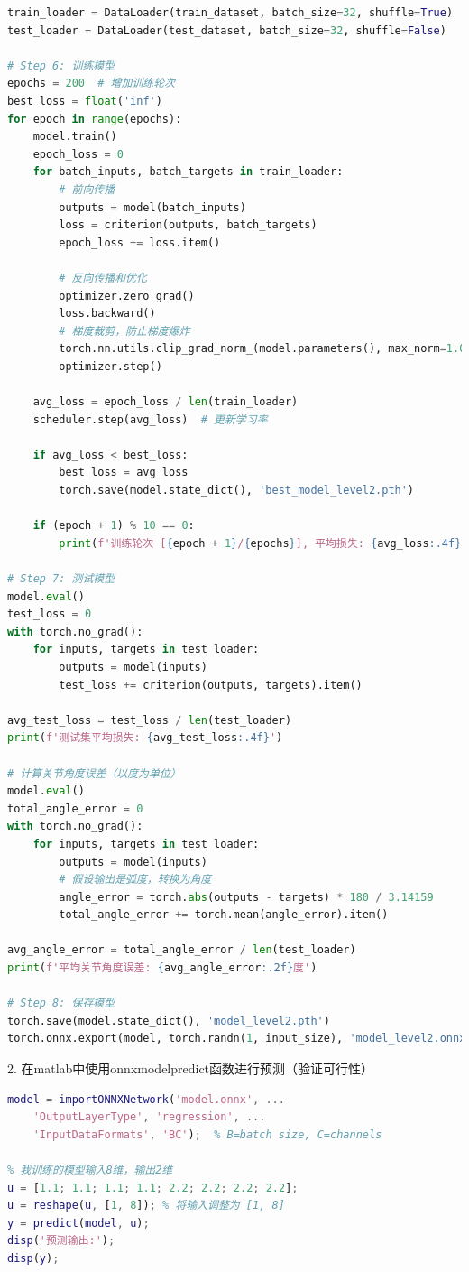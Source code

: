 \documentclass[12pt,a4paper,UTF8]{article}
\begin{document}
\begin{lstlisting}[language=Python,caption=使用pytorch训练模型]
train_loader = DataLoader(train_dataset, batch_size=32, shuffle=True)
test_loader = DataLoader(test_dataset, batch_size=32, shuffle=False)

# Step 6: 训练模型
epochs = 200  # 增加训练轮次
best_loss = float('inf')
for epoch in range(epochs):
    model.train()
    epoch_loss = 0
    for batch_inputs, batch_targets in train_loader:
        # 前向传播
        outputs = model(batch_inputs)
        loss = criterion(outputs, batch_targets)
        epoch_loss += loss.item()

        # 反向传播和优化
        optimizer.zero_grad()
        loss.backward()
        # 梯度裁剪，防止梯度爆炸
        torch.nn.utils.clip_grad_norm_(model.parameters(), max_norm=1.0)
        optimizer.step()
    
    avg_loss = epoch_loss / len(train_loader)
    scheduler.step(avg_loss)  # 更新学习率
    
    if avg_loss < best_loss:
        best_loss = avg_loss
        torch.save(model.state_dict(), 'best_model_level2.pth')

    if (epoch + 1) % 10 == 0:
        print(f'训练轮次 [{epoch + 1}/{epochs}], 平均损失: {avg_loss:.4f}')

# Step 7: 测试模型
model.eval()
test_loss = 0
with torch.no_grad():
    for inputs, targets in test_loader:
        outputs = model(inputs)
        test_loss += criterion(outputs, targets).item()
        
avg_test_loss = test_loss / len(test_loader)
print(f'测试集平均损失: {avg_test_loss:.4f}')

# 计算关节角度误差（以度为单位）
model.eval()
total_angle_error = 0
with torch.no_grad():
    for inputs, targets in test_loader:
        outputs = model(inputs)
        # 假设输出是弧度，转换为角度
        angle_error = torch.abs(outputs - targets) * 180 / 3.14159
        total_angle_error += torch.mean(angle_error).item()

avg_angle_error = total_angle_error / len(test_loader)
print(f'平均关节角度误差: {avg_angle_error:.2f}度')

# Step 8: 保存模型
torch.save(model.state_dict(), 'model_level2.pth')
torch.onnx.export(model, torch.randn(1, input_size), 'model_level2.onnx', input_names=['input'], output_names=['output'])
\end{lstlisting}



2. 在matlab中使用onnxmodelpredict函数进行预测（验证可行性）

\begin{lstlisting}[language=Matlab,caption=使用onnxmodelpredict函数进行预测]
model = importONNXNetwork('model.onnx', ...
    'OutputLayerType', 'regression', ...
    'InputDataFormats', 'BC');  % B=batch size, C=channels

% 我训练的模型输入8维，输出2维
u = [1.1; 1.1; 1.1; 1.1; 2.2; 2.2; 2.2; 2.2];
u = reshape(u, [1, 8]); % 将输入调整为 [1, 8]
y = predict(model, u);
disp('预测输出:');
disp(y);
\end{lstlisting}
\end{document}
